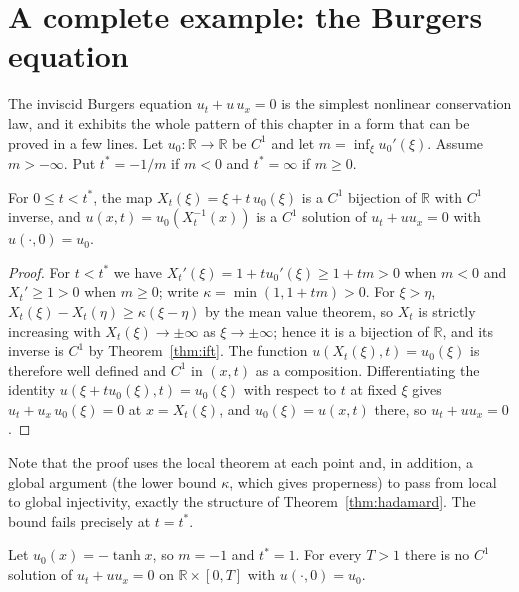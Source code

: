 \section{A complete example: the Burgers equation}
\label{sec:burgers}

The inviscid Burgers equation $u_t+u\,u_x=0$ is the simplest nonlinear conservation law, and it exhibits the whole pattern of this chapter in a form that can be proved in a few lines. Let $u_0:\mathbb R\to\mathbb R$ be $C^1$ and let $m=\inf_\xi u_0'(\xi)$. Assume $m>-\infty$. Put $t^\ast=-1/m$ if $m<0$ and $t^\ast=\infty$ if $m\ge0$.

\begin{theorem}
\label{thm:burgers}
For $0\le t<t^\ast$, the map $X_t(\xi)=\xi+t\,u_0(\xi)$ is a $C^1$ bijection of $\mathbb R$ with $C^1$ inverse, and $u(x,t)=u_0(X_t^{-1}(x))$ is a $C^1$ solution of $u_t+uu_x=0$ with $u(\cdot,0)=u_0$.
\end{theorem}

\begin{proof}
For $t<t^\ast$ we have $X_t'(\xi)=1+tu_0'(\xi)\ge1+tm>0$ when $m<0$ and $X_t'\ge1>0$ when $m\ge0$; write $\kappa=\min(1,1+tm)>0$. For $\xi>\eta$, $X_t(\xi)-X_t(\eta)\ge\kappa(\xi-\eta)$ by the mean value theorem, so $X_t$ is strictly increasing with $X_t(\xi)\to\pm\infty$ as $\xi\to\pm\infty$; hence it is a bijection of $\mathbb R$, and its inverse is $C^1$ by Theorem~\ref{thm:ift}. The function $u(X_t(\xi),t)=u_0(\xi)$ is therefore well defined and $C^1$ in $(x,t)$ as a composition. Differentiating the identity $u(\xi+tu_0(\xi),t)=u_0(\xi)$ with respect to $t$ at fixed $\xi$ gives $u_t+u_x\,u_0(\xi)=0$ at $x=X_t(\xi)$, and $u_0(\xi)=u(x,t)$ there, so $u_t+uu_x=0$.
\end{proof}

Note that the proof uses the local theorem at each point and, in addition, a global argument (the lower bound $\kappa$, which gives properness) to pass from local to global injectivity, exactly the structure of Theorem~\ref{thm:hadamard}. The bound fails precisely at $t=t^\ast$.

\begin{theorem}
\label{thm:shock}
Let $u_0(x)=-\tanh x$, so $m=-1$ and $t^\ast=1$. For every $T>1$ there is no $C^1$ solution of $u_t+uu_x=0$ on $\mathbb R\times[0,T]$ with $u(\cdot,0)=u_0$.
\end{theorem}

